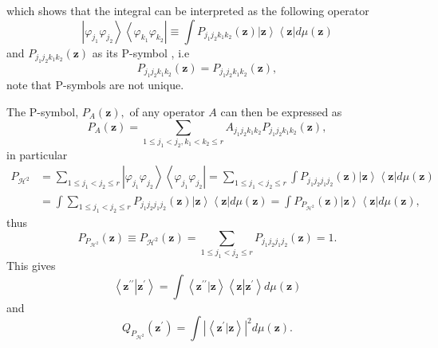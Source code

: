 \documentclass[aps,preprint]{revtex4}%
\begin{document}
which shows that the integral can be interpreted as the following operator
\begin{equation}
\left\vert \varphi_{j_{1}}\varphi_{j_{2}}\right\rangle \left\langle
\varphi_{k_{1}}\varphi_{k_{2}}\right\vert \equiv\int P_{j_{1}j_{2}k_{1}k_{2}%
}\left(  \mathbf{z}\right)  \left\vert \mathbf{z}\right\rangle \left\langle
\mathbf{z}\right\vert d\mu\left(  \mathbf{z}\right)
\end{equation}
and $P_{j_{1}j_{2}k_{1}k_{2}}\left(  \mathbf{z}\right)  $ as its P-symbol ,
i.e
\begin{equation}
P_{j_{1}j_{2}k_{1}k_{2}}\left(  \mathbf{z}\right)  =P_{j_{1}j_{2}k_{1}k_{2}%
}\left(  \mathbf{z}\right)  ,
\end{equation}
note that P-symbols are not unique.

The P-symbol, $P_{A}\left(  \mathbf{z}\right)  ,$ of any operator $A$ can then
be expressed as%
\begin{equation}
P_{A}\left(  \mathbf{z}\right)  =\sum_{1\leq j_{1}<j_{2},k_{1}<k_{2}\leq
r}A_{j_{1}j_{2}k_{1}k_{2}}P_{j_{1}j_{2}k_{1}k_{2}}\left(  \mathbf{z}\right)  ,
\end{equation}
in particular
\begin{align}
P_{\mathcal{H}^{2}} &  =\sum_{1\leq j_{1}<j_{2}\leq r}\left\vert
\varphi_{j_{1}}\varphi_{j_{2}}\right\rangle \left\langle \varphi_{j_{1}%
}\varphi_{j_{2}}\right\vert =\sum_{1\leq j_{1}<j_{2}\leq r}\int P_{j_{1}%
j_{2}j_{1}j_{2}}\left(  \mathbf{z}\right)  \left\vert \mathbf{z}\right\rangle
\left\langle \mathbf{z}\right\vert d\mu\left(  \mathbf{z}\right)  \nonumber\\
&  =\int\sum_{1\leq j_{1}<j_{2}\leq r}P_{j_{1}j_{2}j_{1}j_{2}}\left(
\mathbf{z}\right)  \left\vert \mathbf{z}\right\rangle \left\langle
\mathbf{z}\right\vert d\mu\left(  \mathbf{z}\right)  =\int P_{P_{\mathcal{H}%
^{2}}}\left(  \mathbf{z}\right)  \left\vert \mathbf{z}\right\rangle
\left\langle \mathbf{z}\right\vert d\mu\left(  \mathbf{z}\right)  ,
\end{align}
thus%
\begin{equation}
P_{P_{\mathcal{H}^{2}}}\left(  \mathbf{z}\right)  \equiv P_{\mathcal{H}^{2}%
}\left(  \mathbf{z}\right)  =\sum_{1\leq j_{1}<j_{2}\leq r}P_{j_{1}j_{2}%
j_{1}j_{2}}\left(  \mathbf{z}\right)  =1.
\end{equation}
This gives%
\begin{equation}
\left\langle \mathbf{z}^{\prime\prime}\left\vert \mathbf{z}^{\prime}\right.
\right\rangle =\int\left\langle \mathbf{z}^{\prime\prime}\left\vert
\mathbf{z}\right.  \right\rangle \left\langle \mathbf{z}\left\vert
\mathbf{z}^{\prime}\right.  \right\rangle d\mu\left(  \mathbf{z}\right)
\end{equation}
and
\begin{equation}
Q_{P_{\mathcal{H}^{2}}}\left(  \mathbf{z}^{\prime}\right)  =\int\left\vert
\left\langle \mathbf{z}^{\prime}\left\vert \mathbf{z}\right.  \right\rangle
\right\vert ^{2}d\mu\left(  \mathbf{z}\right)  .
\end{equation}
\end{document}
